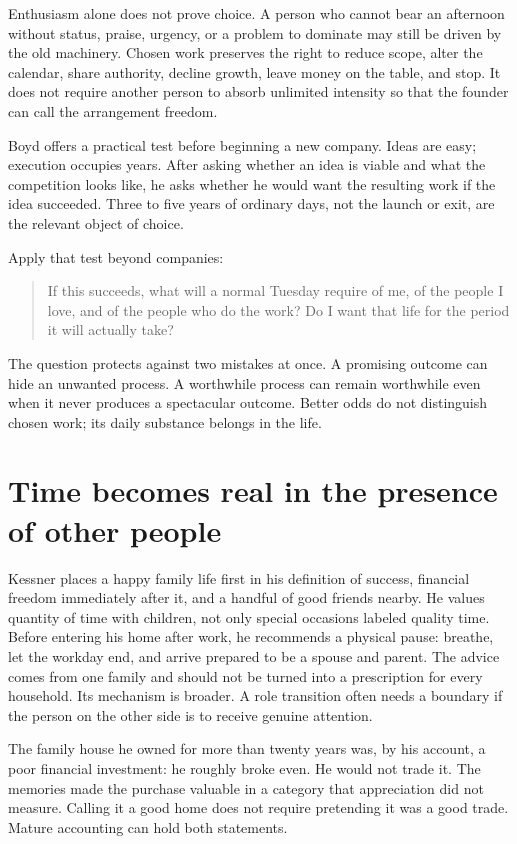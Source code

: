Enthusiasm alone does not prove choice. A person who cannot bear an afternoon
without status, praise, urgency, or a problem to dominate may still be driven
by the old machinery. Chosen work preserves the right to reduce scope, alter
the calendar, share authority, decline growth, leave money on the table, and
stop. It does not require another person to absorb unlimited intensity so that
the founder can call the arrangement freedom.

Boyd offers a practical test before beginning a new company. Ideas are easy;
execution occupies years. After asking whether an idea is viable and what the
competition looks like, he asks whether he would want the resulting work if
the idea succeeded. Three to five years of ordinary days, not the launch or
exit, are the relevant object of choice.

Apply that test beyond companies:

\begin{quote}
If this succeeds, what will a normal Tuesday require of me, of the people I
love, and of the people who do the work? Do I want that life for the period it
will actually take?
\end{quote}

The question protects against two mistakes at once. A promising outcome can
hide an unwanted process. A worthwhile process can remain worthwhile even
when it never produces a spectacular outcome. Better odds do not distinguish
chosen work; its daily substance belongs in the life.

\section{Time becomes real in the presence of other people}

Kessner places a happy family life first in his definition of success,
financial freedom immediately after it, and a handful of good friends nearby.
He values quantity of time with children, not only special occasions labeled
quality time. Before entering his home after work, he recommends a physical
pause: breathe, let the workday end, and arrive prepared to be a spouse and
parent. The advice comes from one family and should not be turned into a
prescription for every household. Its mechanism is broader. A role transition
often needs a boundary if the person on the other side is to receive genuine
attention.

The family house he owned for more than twenty years was, by his account, a
poor financial investment: he roughly broke even. He would not trade it. The
memories made the purchase valuable in a category that appreciation did not
measure. Calling it a good home does not require pretending it was a good
trade. Mature accounting can hold both statements.

